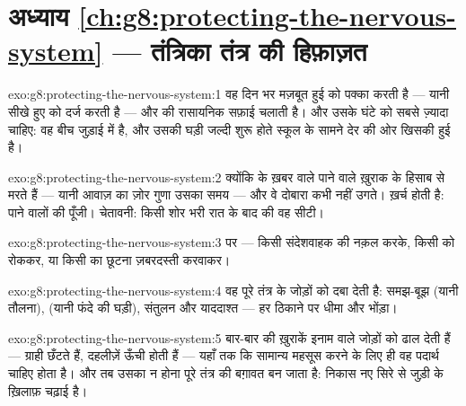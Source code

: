 \section*{अध्याय \ref{ch:g8:protecting-the-nervous-system} --- तंत्रिका तंत्र की हिफ़ाज़त}

\begin{solution}{exo:g8:protecting-the-nervous-system:1}
वह दिन भर मज़बूत हुई  को पक्का करती है --- यानी सीखे हुए
को दर्ज करती है --- और  की रासायनिक सफ़ाई चलाती है। और उसके घंटे
  को सबसे ज़्यादा चाहिए: वह बीच जुड़ाई में है, और उसकी घड़ी
जल्दी शुरू होते स्कूल के सामने देर की ओर खिसकी हुई है।
\end{solution}

\begin{solution}{exo:g8:protecting-the-nervous-system:2}
क्योंकि  के ख़बर वाले पाने वाले ख़ुराक के हिसाब से मरते हैं --- यानी
आवाज़ का ज़ोर गुणा उसका समय --- और वे दोबारा कभी नहीं उगते। ख़र्च होती
है: पाने वालों की पूँजी। चेतावनी: किसी शोर भरी रात के बाद की वह सीटी।
\end{solution}

\begin{solution}{exo:g8:protecting-the-nervous-system:3}
 पर --- किसी संदेशवाहक की नक़ल करके, किसी को रोककर, या
किसी का छूटना ज़बरदस्ती करवाकर।
\end{solution}

\begin{solution}{exo:g8:protecting-the-nervous-system:4}
वह पूरे तंत्र के जोड़ों को दबा देती है: समझ-बूझ (यानी तौलना),  (यानी फंदे की घड़ी), संतुलन और याददाश्त --- हर ठिकाने पर धीमा और
भोंड़ा।
\end{solution}

\begin{solution}{exo:g8:protecting-the-nervous-system:5}
बार-बार की ख़ुराकें इनाम वाले जोड़ों को ढाल देती हैं --- ग्राही छँटते
हैं, दहलीज़ें ऊँची होती हैं --- यहाँ तक कि सामान्य महसूस करने के लिए ही
वह पदार्थ चाहिए होता है। और तब उसका न होना पूरे तंत्र की बग़ावत बन जाता
है: निकास नए सिरे से जुड़ी  के ख़िलाफ़ चढ़ाई है।
\end{solution}

